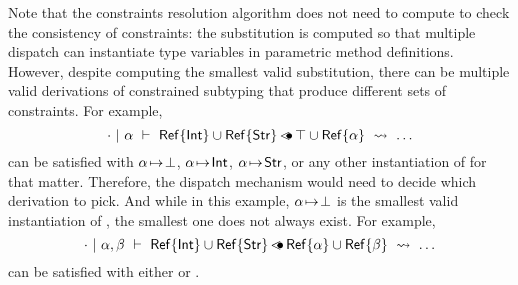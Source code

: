 Note that the constraints resolution algorithm does not need to compute
\substvars to check the consistency of constraints: the substitution 
is computed so that multiple dispatch can instantiate type variables
in parametric method definitions. However, despite \solvectrdflt
computing the smallest valid substitution, there can be multiple valid
derivations of constrained subtyping that produce different
sets of constraints.
For example,
\[
    \cdot~\vert~\alpha\ \vdash\ \mathsf{Ref}\{\mathsf{Int}\} \cup \mathsf{Ref}\{\mathsf{Str}\} \operatorname{\lessdot\!\!\bullet} \top \cup \mathsf{Ref}\{\alpha\}\ \rightsquigarrow\ \ldots
\]
can be satisfied with $\alpha\!\mapsto\!\bot$, $\alpha\!\mapsto\!\mathsf{Int}$,
$\alpha\!\mapsto\!\mathsf{Str}$, or any other instantiation of \va for that matter.
Therefore, the dispatch mechanism would need to decide which derivation to pick.
And while in this example, $\alpha\!\mapsto\!\bot$ is the smallest valid
instantiation of \va, the smallest one does not always exist.
For example,
\[
    \cdot~\vert~\alpha,\beta\ \vdash\ \mathsf{Ref}\{\mathsf{Int}\} \cup \mathsf{Ref}\{\mathsf{Str}\} \operatorname{\lessdot\!\!\bullet} \mathsf{Ref}\{\alpha\} \cup \mathsf{Ref}\{\beta\}\ \rightsquigarrow\ \ldots
\]
can be satisfied with either
\subst{}{\substel{\va}{\tyint}, \substel{\vb}{\tystr\!}\!} or
\subst{}{\substel{\va}{\tystr}, \substel{\vb}{\tyint\!}\!}.

